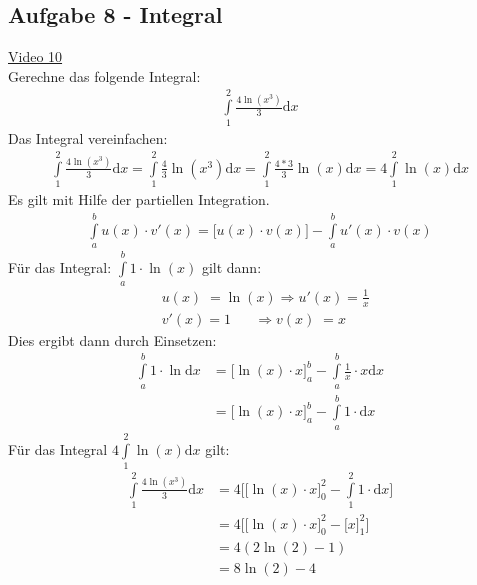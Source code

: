 \subsection{Aufgabe 8 - Integral}
\href{https://youtu.be/VEksC5lXo9o}{Video 10}\\
Gerechne das folgende Integral:\\
\begin{align*}
\int\limits_{1}^{2} \frac{4\ln(x^3)}{3}\mathrm{d}x
\end{align*}
Das Integral vereinfachen:\\
\begin{align*}
\int\limits_{1}^{2} \frac{4\ln(x^3)}{3}\mathrm{d}x=\int\limits_{1}^{2} \frac{4}{3}\ln(x^3)\mathrm{d}x=\int\limits_{1}^{2} \frac{4*3}{3}\ln(x)\mathrm{d}x=4\int\limits_{1}^{2} \ln(x)\mathrm{d}x
\end{align*}
Es gilt mit Hilfe der partiellen Integration.\\
\begin{align*}
\int\limits_{a}^{b} u(x)\cdot v'(x)=\big [u(x)\cdot v(x)\big]-\int\limits_{a}^{b} u'(x)\cdot v(x)
\end{align*}
Für das Integral: $ \int\limits_{a}^{b}1\cdot \ln(x) $ gilt dann:\\
\begin{align*}
&u(x)\;=\ln(x)\Rightarrow u'(x)=\frac{1}{x}\\
&v'(x)=1\;\;\;\;\;\;\Rightarrow v(x)\;=x
\end{align*}
Dies ergibt dann durch Einsetzen:\\
\begin{align*}
\int\limits_{a}^{b}1\cdot \ln \mathrm{d}x&=  \big[\ln(x)\cdot x\big]^b_a-\int\limits_{a}^{b} \frac{1}{x}\cdot x \mathrm{d}x\\
&=\big[\ln(x)\cdot x\big]^b_a-\int\limits_{a}^{b}1\cdot \mathrm{d}x
\end{align*}
Für das Integral $4\int\limits_{1}^{2} \ln(x) \mathrm{d} x$ gilt:\\
\begin{align*}
\int\limits_{1}^{2} \frac{4\ln(x^3)}{3}\mathrm{d}x&=4\bigg [  \big[\ln(x)\cdot x\big]^2_0-\int\limits_{1}^{2} 1\cdot  \mathrm{d}x\bigg]\\
&=4\bigg [ \big[\ln(x)\cdot x\big]^2_0-\big[x\big]^2_1\bigg]\\
&=4(2\ln(2)-1)\\
&=8\ln(2)-4
\end{align*}

